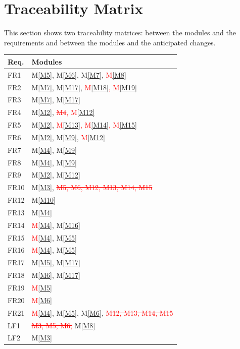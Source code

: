 \documentclass[12pt, titlepage]{article}
\newcommand{\mref}[1]{M\ref{#1}}
\begin{document}
\section{Traceability Matrix} \label{SecTM}

This section shows two traceability matrices: between the modules and the
requirements and between the modules and the anticipated changes.

\begin{table}[H]
\centering
\begin{tabular}{p{} p{}}
\toprule
\textbf{Req.} & \textbf{Modules}\\
\midrule
FR1 & \mref{M5}, \mref{M6}, \mref{M7}, \textcolor{red}{\mref{M8}}\\
FR2 & \mref{M7}, \mref{M17}, \textcolor{red}{\mref{M18}, \mref{M19}}\\
FR3 & \mref{M7}, \mref{M17}\\
FR4 & \mref{M2}, \textcolor{red}{\sout{M4}, \mref{M12}}\\
FR5 & \mref{M2}, \textcolor{red}{\mref{M13}, \mref{M14}, \mref{M15}}\\
FR6 & \mref{M2}, \mref{M9}, \textcolor{red}{\mref{M12}}\\
FR7 & \mref{M4}, \mref{M9}\\
FR8 & \mref{M4}, \mref{M9}\\
FR9 & \mref{M2}, \mref{M12}\\
FR10 & \mref{M3}, \textcolor{red}{\sout{M5, M6, M12, M13, M14, M15}}\\
FR12 & \mref{M10}\\
FR13 & \mref{M4}\\
FR14 & \textcolor{red}{\mref{M4}}, \mref{M16}\\
FR15 & \textcolor{red}{\mref{M4}}, \mref{M5}\\
FR16 & \textcolor{red}{\mref{M4}}, \mref{M5}\\
FR17 & \mref{M5}, \mref{M17}\\
FR18 & \mref{M6}, \mref{M17}\\
FR19 & \textcolor{red}{\mref{M5}}\\
FR20 & \textcolor{red}{\mref{M6}}\\
FR21 & \textcolor{red}{\mref{M4}}, \mref{M5}, \mref{M6}, \textcolor{red}{\sout{M12, M13, M14, M15}}\\
LF1 & \textcolor{red}{\sout{M3, M5, M6,}} \mref{M8}\\
LF2 & \mref{M3}\\

\end{tabular}
\end{table}
\end{document}
